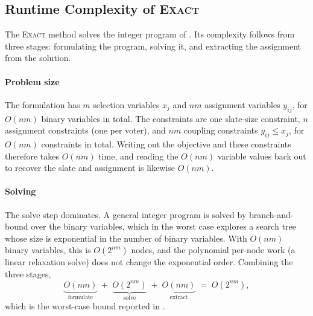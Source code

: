 \documentclass[11pt]{article}
\newcommand{\Exact}{\textsc{Exact}}
\begin{document}



\subsection{Runtime Complexity of \Exact{}} \label{app:brute-force-vs-exact}
The \Exact{} method solves the integer program of . Its complexity follows from three stages: formulating the program, solving it, and extracting the assignment from the solution.

\paragraph{Problem size} The formulation has $m$ selection variables $x_j$ and $nm$ assignment variables $y_{ij}$, for $O(nm)$ binary variables in total. The constraints are one slate-size constraint, $n$ assignment constraints (one per voter), and $nm$ coupling constraints $y_{ij}\le x_j$, for $O(nm)$ constraints in total. Writing out the objective and these constraints therefore takes $O(nm)$ time, and reading the $O(nm)$ variable values back out to recover the slate and assignment is likewise $O(nm)$.

\paragraph{Solving} The solve step dominates. A general integer program is solved by branch-and-bound over the binary variables, which in the worst case explores a search tree whose size is exponential in the number of binary variables. With $O(nm)$ binary variables, this is $O(2^{nm})$ nodes, and the polynomial per-node work (a linear relaxation solve) does not change the exponential order. Combining the three stages,
\[
\underbrace{O(nm)}_{\text{formulate}} \;+\; \underbrace{O(2^{nm})}_{\text{solve}} \;+\; \underbrace{O(nm)}_{\text{extract}} \;=\; O(2^{nm}),
\]
which is the worst-case bound reported in .
\end{document}
